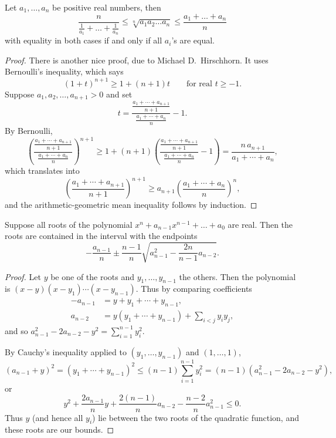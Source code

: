 \begin{theorem}
  \label{ch20theoremIIproof3}
  \leanok
  Let $a_1, \dots, a_n$ be positive real numbers, then
  \[
  \frac{n}{\frac{1}{a_1}+\dots+\frac{1}{a_n}} \le
    \sqrt[n]{a_1a_2\dots a_n} \le
    \frac{a_1+\dots+ a_n}{n}
  \]
 with equality in both cases if and only if all $a_i$'s are equal.
\end{theorem}
 \begin{proof}
  \leanok
  There is another nice proof, due to Michael D.\ Hirschhorn. It uses Bernoulli's inequality, which says
  \[
  (1+t)^{n+1} \ge 1 + (n+1)t \qquad \text{for real } t \ge -1.
  \]
  Suppose $a_1, a_2, \dots, a_{n+1} > 0$ and set
  \[
  t = \frac{\frac{a_1 + \cdots + a_{n+1}}{n+1}}{\frac{a_1 + \cdots + a_n}{n}} - 1.
  \]
  By Bernoulli,
  \[
  \left(\frac{\frac{a_1 + \cdots + a_{n+1}}{n+1}}{\frac{a_1 + \cdots + a_n}{n}}\right)^{n+1}
  \ge 1 + (n+1)\left(\frac{\frac{a_1 + \cdots + a_{n+1}}{n+1}}{\frac{a_1 + \cdots + a_n}{n}} - 1\right)
  = \frac{n\, a_{n+1}}{a_1 + \cdots + a_n},
  \]
  which translates into
  \[
  \left(\frac{a_1 + \cdots + a_{n+1}}{n+1}\right)^{n+1} \ge a_{n+1} \left(\frac{a_1 + \cdots + a_n}{n}\right)^n,
  \]
  and the arithmetic-geometric mean inequality follows by induction.
\end{proof}

\begin{theorem}
  \label{ch20theorem1}
  \leanok
  Suppose all roots of the polynomial
  $x^n + a_{n-1}x^{n-1} + \dots + a_0$ are real.
  Then the roots are contained in the interval with the endpoints
  \[
  -\frac{a_{n-1}}{n}\pm\frac{n-1}{n}\sqrt{a_{n-1}^2 - \frac{2n}{n-1}a_{n-2}}.
  \]
\end{theorem}
\begin{proof}
  \leanok
  Let $y$ be one of the roots and $y_1, \dots, y_{n-1}$ the others. Then
  the polynomial is $(x-y)(x-y_1)\cdots(x-y_{n-1})$. Thus by comparing coefficients
  \begin{align*}
  -a_{n-1} &= y + y_1 + \cdots + y_{n-1}, \\
  a_{n-2} &= y(y_1 + \cdots + y_{n-1}) + \sum_{i<j} y_i y_j,
  \end{align*}
  and so $a_{n-1}^2 - 2a_{n-2} - y^2 = \sum_{i=1}^{n-1} y_i^2$.

  By Cauchy's inequality applied to $(y_1, \dots, y_{n-1})$ and $(1, \dots, 1)$,
  \[
  (a_{n-1} + y)^2 = (y_1 + \cdots + y_{n-1})^2 \le (n-1)\sum_{i=1}^{n-1} y_i^2 = (n-1)(a_{n-1}^2 - 2a_{n-2} - y^2),
  \]
  or
  \[
  y^2 + \frac{2a_{n-1}}{n}y + \frac{2(n-1)}{n}a_{n-2} - \frac{n-2}{n}a_{n-1}^2 \le 0.
  \]
  Thus $y$ (and hence all $y_i$) lie between the two roots of the quadratic function,
  and these roots are our bounds.
\end{proof}



